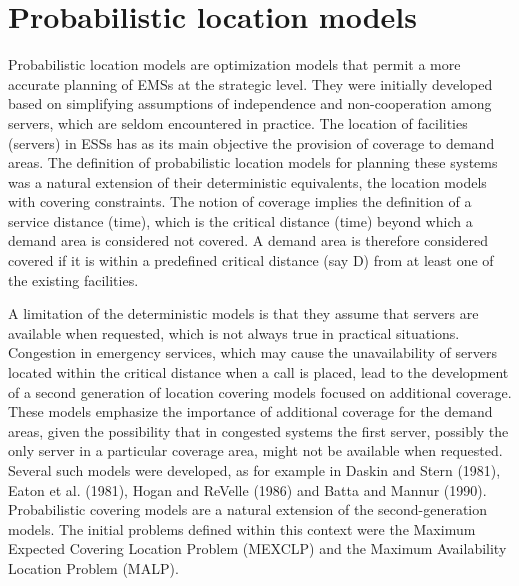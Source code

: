 \section{Probabilistic location models}
Probabilistic location models
are optimization models
that permit a more accurate planning
of EMSs at the strategic level.
They were initially developed
based on simplifying assumptions of independence
and non-cooperation among servers,
which are seldom encountered in practice.
The location of facilities (servers) in ESSs
has as its main objective
the provision of coverage to demand areas.
The definition of
probabilistic location models for planning these systems
was a natural extension
of their deterministic equivalents,
the location models with covering constraints.
The notion of coverage
implies
the definition of a service distance (time),
which is the critical distance (time)
beyond which a demand area is considered not covered.
A demand area is
therefore
considered covered
if
it is within a predefined critical distance (say D)
from at least one of the existing facilities.

A limitation of the deterministic models
is that
they assume
that servers are available when requested,
which is not always true in practical situations.
Congestion in emergency services,
which may cause
the unavailability
of servers located
within the critical distance
when a call is placed,
lead to
the development of
a second generation of location covering models
focused on additional coverage.
These models
emphasize the importance of additional coverage
for the demand areas,
given the possibility that
in congested systems
the first server,
possibly
the only server in a particular coverage area,
might not be available when requested.
Several such models were developed,
as for example in Daskin and Stern (1981),
Eaton et al. (1981),
Hogan and ReVelle (1986)
and Batta and Mannur (1990).
Probabilistic covering models
are a natural extension
of the second-generation models.
The initial problems
defined within this context
were
the Maximum Expected Covering Location Problem (MEXCLP)
and
the Maximum Availability Location Problem (MALP).
